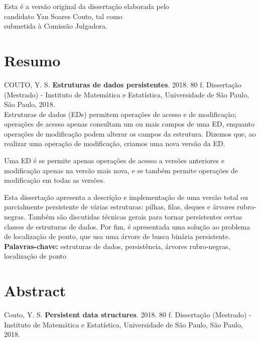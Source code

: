 \documentclass[11pt,oneside,a4paper, openany]{book}
\begin{document}
    \vskip 2cm

    \begin{flushright}
    Esta é a versão original da dissertação elaborada pelo\\
    candidato Yan Soares Couto, tal como \\
    submetida à Comissão Julgadora.
    \end{flushright}

\pagebreak


\chapter*{Resumo}

\noindent COUTO, Y. S. \textbf{Estruturas de dados persistentes}.
2018. 80 f.
Dissertação (Mestrado) - Instituto de Matemática e Estatística,
Universidade de São Paulo, São Paulo, 2018.
\\

Estruturas de dados (EDs) permitem operações de acesso e de modificação; operações de acesso apenas consultam um ou mais campos de uma ED, enquanto operações de modificação podem alterar os campos da estrutura. Dizemos que, ao realizar uma operação de modificação, criamos uma nova versão da ED.

Uma ED é  se permite apenas operações de acesso a versões anteriores e modificação apenas na versão mais nova, e  se também permite operações de modificação em todas as versões.

Esta dissertação apresenta a descrição e implementação de uma versão total ou parcialmente persistente de várias estruturas: pilhas, filas, deques e árvores rubro-negras. Também são discutidas técnicas gerais para tornar persistentes certas classes de estruturas de dados. Por fim, é apresentada uma solução ao problema de localização de ponto, que usa uma árvore de busca binária persistente.
\\

\noindent \textbf{Palavras-chave:} estruturas de dados, persistência, árvores rubro-negras, localização de ponto

\chapter*{Abstract}
\noindent Couto, Y. S. \textbf{Persistent data structures}. 
2018. 80 f.
Dissertação (Mestrado) - Instituto de Matemática e Estatística,
Universidade de São Paulo, São Paulo, 2018.
\\
\end{document}
